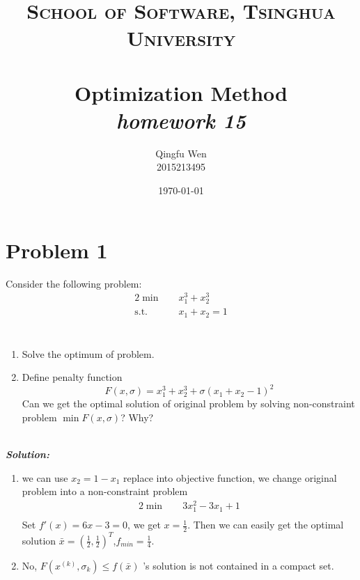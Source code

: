 \documentclass[paper=a4, fontsize=11pt]{scrartcl} %
\title{	
\normalfont \normalsize
\textsc{School of Software, Tsinghua University} \\ [25pt] %
\horrule{0.5pt} \\[0.4cm] %
\huge Optimization Method\\ %
\LARGE\textit{homework 15}
\horrule{2pt} \\[0.5cm] %
}
\author{Qingfu Wen \\ \normalsize 2015213495} %
\date{\normalsize\today} %
\numberwithin{equation}{section} %
\numberwithin{figure}{section} %
\numberwithin{table}{section} %
\begin{document}
\maketitle %
\tableofcontents
\newpage
\section{Problem 1}
Consider the following problem:
\begin{alignat}{2}          \nonumber
\min\quad & x_1^3+x_2^3 \\    \nonumber
\mbox{s.t.}\quad            \nonumber
& x_1+x_2=1 \\    \nonumber
\end{alignat}\\
\begin{enumerate}
\item Solve the optimum of problem.
\item Define penalty function 
\begin{equation}\nonumber
F(x,\sigma) = x_1^3+x_2^3+\sigma(x_1+x_2-1)^2
\end{equation}
Can we get the optimal solution of original problem by solving non-constraint problem $\min F(x,\sigma)$? Why?
\end{enumerate}
~\\
\emph{\textbf{Solution:}}\\
\begin{enumerate}
\item we can use $x_2 = 1-x_1$ replace into objective function, we change original problem into a non-constraint problem
\begin{alignat}{2}          \nonumber
\min\quad & 3x_1^2-3x_1+1 \\    \nonumber
\end{alignat}
Set $f'(x)=6x-3=0$, we get $x=\frac{1}{2}$. Then we can easily get the optimal solution $\bar{x}=(\frac{1}{2},\frac{1}{2})^T$,$f_{min}=\frac{1}{4}$.
\item No, $F(x^{(k)},\sigma_k)\leq f(\bar{x})$ 's solution is not contained in a compact set.
\end{enumerate}
\end{document}
